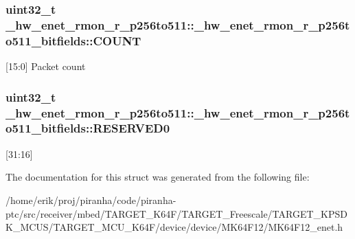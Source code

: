 \subsubsection[{\texorpdfstring{C\+O\+U\+NT}{COUNT}}]{\setlength{\rightskip}{0pt plus 5cm}uint32\+\_\+t \+\_\+hw\+\_\+enet\+\_\+rmon\+\_\+r\+\_\+p256to511\+::\+\_\+hw\+\_\+enet\+\_\+rmon\+\_\+r\+\_\+p256to511\+\_\+bitfields\+::\+C\+O\+U\+NT}\hypertarget{struct__hw__enet__rmon__r__p256to511_1_1__hw__enet__rmon__r__p256to511__bitfields_a999d018aa6d172b440c11c26166748cf}{}\label{struct__hw__enet__rmon__r__p256to511_1_1__hw__enet__rmon__r__p256to511__bitfields_a999d018aa6d172b440c11c26166748cf}
\mbox{[}15\+:0\mbox{]} Packet count 
\subsubsection[{\texorpdfstring{R\+E\+S\+E\+R\+V\+E\+D0}{RESERVED0}}]{\setlength{\rightskip}{0pt plus 5cm}uint32\+\_\+t \+\_\+hw\+\_\+enet\+\_\+rmon\+\_\+r\+\_\+p256to511\+::\+\_\+hw\+\_\+enet\+\_\+rmon\+\_\+r\+\_\+p256to511\+\_\+bitfields\+::\+R\+E\+S\+E\+R\+V\+E\+D0}\hypertarget{struct__hw__enet__rmon__r__p256to511_1_1__hw__enet__rmon__r__p256to511__bitfields_ab14bb2e7e94b45db27e1af1184994f64}{}\label{struct__hw__enet__rmon__r__p256to511_1_1__hw__enet__rmon__r__p256to511__bitfields_ab14bb2e7e94b45db27e1af1184994f64}
\mbox{[}31\+:16\mbox{]} 

The documentation for this struct was generated from the following file\+:\begin{DoxyCompactItemize}
\item 
/home/erik/proj/piranha/code/piranha-\/ptc/src/receiver/mbed/\+T\+A\+R\+G\+E\+T\+\_\+\+K64\+F/\+T\+A\+R\+G\+E\+T\+\_\+\+Freescale/\+T\+A\+R\+G\+E\+T\+\_\+\+K\+P\+S\+D\+K\+\_\+\+M\+C\+U\+S/\+T\+A\+R\+G\+E\+T\+\_\+\+M\+C\+U\+\_\+\+K64\+F/device/device/\+M\+K64\+F12/M\+K64\+F12\+\_\+enet.\+h\end{DoxyCompactItemize}

